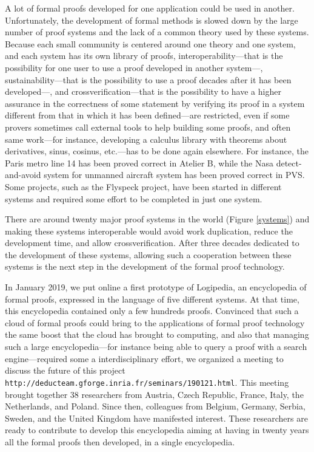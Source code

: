 A lot of formal proofs developed for one application could be used in
another.  Unfortunately, the development of formal methods is slowed
down by the large number of proof systems and the lack of a common
theory used by these systems.  Because each small community is
centered around one theory and one system, and each system has its own
library of proofs, interoperability---that is the possibility for one
user to use a proof developed in another system---,
sustainability---that is the possibility to use a proof decades after
it has been developed---, and crossverification---that is the
possibility to have a higher assurance in the correctness of some
statement by verifying its proof in a system different from that in
which it has been defined---are restricted, even if some provers
sometimes call external tools to help building some proofs, and often
same work---for instance, developing a calculus library with theorems
about derivatives, sinus, cosinus, etc.---has to be done again
elsewhere.  For instance, the Paris metro line 14 has been proved
correct in {\sc Atelier B}, while the Nasa detect-and-avoid system for
unmanned aircraft system has been proved correct in {\sc PVS}. Some
projects, such as the Flyspeck project, have been started in different
systems and required some effort to be completed in just one system.

There are around twenty major proof systems in the world (Figure
\ref{systems}) and making these systems interoperable would avoid work
duplication, reduce the development time, and allow 
crossverification.  After three decades dedicated to the development of
these systems, allowing such a cooperation between these systems is
the next step in the development of the formal proof technology.  

In January 2019, we put online a first prototype of {\sc Logipedia},
an encyclopedia of formal proofs, expressed in the language of five
different systems. At that time, this encyclopedia contained only a
few hundreds proofs.  Convinced that such a cloud of formal proofs
could bring to the applications of formal proof technology the same
boost that the cloud has brought to computing, and also that managing
such a large encyclopedia---for instance being able to query a proof
with a search engine---required some a interdisciplinary effort, we
organized a meeting to discuss the future of this project {\tt
  http://deducteam.gforge.inria.fr/seminars/190121.html}.  This
meeting brought together 38 researchers from Austria, Czech Republic,
France, Italy, the Netherlands, and Poland. Since then, colleagues
from Belgium, Germany, Serbia, Sweden, and the United Kingdom have
manifested interest. These researchers are ready to contribute to
develop this encyclopedia aiming at having in twenty years all the
formal proofs then developed, in a single encyclopedia.

